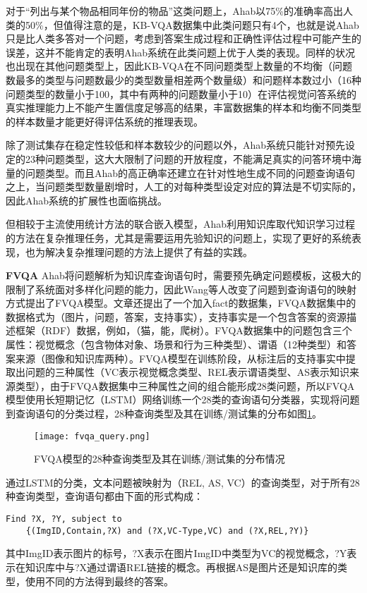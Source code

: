 对于“列出与某个物品相同年份的物品”这类问题上，Ahab以75\%的准确率高出人类的50\%，但值得注意的是，KB-VQA数据集中此类问题只有4个，也就是说Ahab只是比人类多答对一个问题，考虑到答案生成过程和正确性评估过程中可能产生的误差，这并不能肯定的表明Ahab系统在此类问题上优于人类的表现。同样的状况也出现在其他问题类型上，因此KB-VQA在不同问题类型上数量的不均衡（问题数最多的类型与问题数最少的类型数量相差两个数量级）和问题样本数过小（16种问题类型的数量小于100，其中有两种的问题数量小于10）在评估视觉问答系统的真实推理能力上不能产生置信度足够高的结果，丰富数据集的样本和均衡不同类型的样本数量才能更好得评估系统的推理表现。

除了测试集存在稳定性较低和样本数较少的问题以外，Ahab系统只能针对预先设定的23种问题类型，这大大限制了问题的开放程度，不能满足真实的问答环境中海量的问题类型。而且Ahab的高正确率还建立在针对性地生成不同的问题查询语句之上，当问题类型数量剧增时，人工的对每种类型设定对应的算法是不切实际的，因此Ahab系统的扩展性也面临挑战。

但相较于主流使用统计方法的联合嵌入模型，Ahab利用知识库取代知识学习过程的方法在复杂推理任务，尤其是需要运用先验知识的问题上，实现了更好的系统表现，也为解决复杂推理问题的方法上提供了有益的实践。

\textbf{FVQA}
Ahab将问题解析为知识库查询语句时，需要预先确定问题模板，这极大的限制了系统面对多样化问题的能力，因此Wang等人改变了问题到查询语句的映射方式提出了FVQA模型。文章还提出了一个加入fact的数据集，FVQA数据集中的数据格式为（图片，问题，答案，支持事实），支持事实是一个包含答案的资源描述框架（RDF）数据，例如，（猫，能，爬树）。FVQA数据集中的问题包含三个属性：视觉概念（包含物体对象、场景和行为三种类型）、谓语（12种类型）和答案来源（图像和知识库两种）。FVQA模型在训练阶段，从标注后的支持事实中提取出问题的三种属性（VC表示视觉概念类型、REL表示谓语类型、AS表示知识来源类型），由于FVQA数据集中三种属性之间的组合能形成28类问题，所以FVQA模型使用长短期记忆（LSTM）网络训练一个28类的查询语句分类器，实现将问题到查询语句的分类过程，28种查询类型及其在训练/测试集的分布如图\ref{fvqa_query}。
\begin{figure}[H]
	\centering
	\texttt{[image: fvqa\_query.png]}
	\caption{FVQA模型的28种查询类型及其在训练/测试集的分布情况}
	\label{fvqa_query}
\end{figure}

通过LSTM的分类，文本问题被映射为（REL, AS, VC）的查询类型，对于所有28种查询类型，查询语句都由下面的形式构成：
\begin{verbatim}
Find ?X, ?Y, subject to 
	{(ImgID,Contain,?X) and (?X,VC-Type,VC) and (?X,REL,?Y)}
\end{verbatim}
其中ImgID表示图片的标号，?X表示在图片ImgID中类型为VC的视觉概念，?Y表示在知识库中与?X通过谓语REL链接的概念。再根据AS是图片还是知识库的类型，使用不同的方法得到最终的答案。

